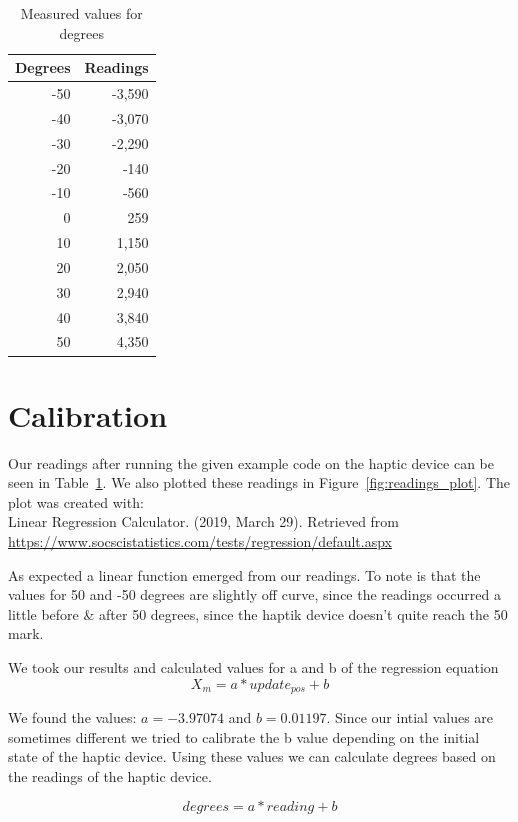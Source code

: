 \documentclass[12pt, a4paper]{article}
\begin{document}
\begin{table}[t]
\centering
\begin{tabular}{|r|r|}
\hline
Degrees & Readings \\ \hline
-50 & -3,590 \\ \hline
-40 & -3,070 \\ \hline
-30 & -2,290 \\ \hline
-20 & -140 \\ \hline
-10 & -560 \\ \hline
0 & 259 \\ \hline
10 & 1,150 \\ \hline
20 & 2,050 \\ \hline
30 & 2,940 \\ \hline
40 & 3,840 \\ \hline
50 & 4,350 \\ \hline
\end{tabular}
\caption{Measured values for degrees}
\label{table:readings}
\end{table}

\section{Calibration} \label{sec:cal}
Our readings after running the given example code on the haptic device can be seen in Table~\ref{table:readings}. We also plotted these readings in Figure~\ref{fig:readings_plot}. The plot was created with: \\
Linear Regression Calculator. (2019, March 29). Retrieved from 
\url{https://www.socscistatistics.com/tests/regression/default.aspx}

As expected a linear function emerged from our readings. To note is that the values for 50 and -50 degrees are slightly off curve, since the readings occurred a little before \& after 50 degrees, since the haptik device doesn’t quite reach the 50 mark.

We took our results and calculated values for a and b of the regression equation
\begin{equation*}
X_m = a * update_{pos} + b
\end{equation*}

We found the values: $a = -3.97074$ and $b = 0.01197$. Since our intial values are sometimes different we tried to calibrate the b value depending on the initial state of the haptic device. Using these values we can calculate degrees based on the readings of the haptic device.

\begin{equation*}
degrees = a * reading + b
\end{equation*}
\end{document}
